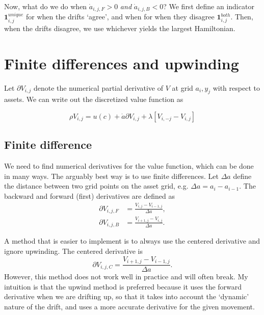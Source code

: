 \documentclass[12pt]{article}
\DeclareMathOperator{\1}{\mathbbm{1}}
\begin{document}
Now, what do we do when $\dot a_{i,j,F}>0$ \textit{and} $\dot a_{i,j,B}<0$? We first define an indicator $\mathbf{1}^{unique}_{i,j}$ for when the drifts `agree', and when for when they disagree $\mathbf{1}^{both}_{i,j}$. Then, when the drifts disagree, we use whichever yields the largest Hamiltonian.

\section{Finite differences and upwinding}
 Let $\partial V_{i,j}$ denote the numerical partial derivative of $V$ at grid $a_i,y_j$ with respect to assets. We can write out the discretized value function as 

\begin{equation}
\rho V_{i,j} =u(c) + \dot a \partial V_{i,j} + \lambda [V_{i,-j} - V_{i,j}]
\end{equation}

\subsection{Finite difference}
We need to find numerical derivatives for the value function, which can be done in many ways. The arguably best way is to use finite differences. Let $\Delta a$ define the distance between two grid points on the asset grid, e.g. $\Delta a=a_i-a_{i-1}$. The backward and forward (first) derivatives are defined as
    \begin{align}
    \partial V_{i,j,F}&=\frac{V_{i,j}-V_{i-1,j}}{\Delta a}, \label{eq:backder}\\
    \partial V_{i,j,B}&=\frac{V_{i+1,j}-V_{i,j}}{\Delta a}. \label{eq:forder}
    \end{align}
    
A method that is easier to implement is to always use the centered derivative and ignore upwinding. The centered derivative is
\begin{equation*}
    \partial V_{i,j,C}=\frac{V_{i+1,j}-V_{i-1,j}}{\Delta a}.
\end{equation*}
However, this method does not work well in practice and will often break. My intuition is that the upwind method is preferred because it uses the forward derivative when we are drifting up, so that it takes into account the `dynamic' nature of the drift, and uses a more accurate derivative for the given movement.
    
\end{document}
